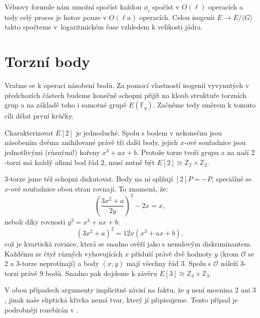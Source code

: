 \documentclass[12pt]{report}
\begin{document}
Véluovy formule nám umožní spočíst každou $\phi_i$ spočíst v $O(\ell)$ operacích a tedy celý proces je hotov pouze v $O(\ell a)$ operacích. Celou isogenii $E \longrightarrow E/\langle G \rangle$ takto spočteme v~logaritmickém čase vzhledem k velikosti jádra.

\section{Torzní body}

Vraťme se k operaci násobení bodů. Za pomocí vlastností isogenií vyvynutých v předchozích částech budeme konečně schopni přijít na kloub struktuře torzních grup a na základě toho i samotné grupě $E(\mathbb{F}_q)$. Začněme tedy směrem k tomuto cíli dělat první krůčky.

Charakterizovat $E[2]$ je jednoduché. Spolu s bodem v nekonečnu jsou násobením dvěma anihilované právě tři další body, jejich $x$-ové souřadnice jsou jednotlivými (různými!) kořeny $x^3+ax+b$. Protože torze tvoří grupu a na naší $2$-torzi má každý afinní bod řád $2$, musí nutně být $E[2] \cong \mathbb{Z}_2 \times \mathbb{Z}_2$.

$3$-torze jsme též schopni diskutovat. Body na ní splňují $[2]P = -P$, speciálně se $x$-ové souřadnice obou stran rovnají. To znamená, že:
\begin{equation*}
\left(\frac{3x^2+a}{2y}\right)^2 -2x = x,
\end{equation*}
neboli díky rovnosti $y^2 = x^3+ax+b$:
\begin{equation*}
(3x^2+a)^2 = 12x(x^3+ax+b),
\end{equation*}
což je kvartická rovnice, která se snadno ověří jako s nenulovým diskriminantem. Každému ze čtyř různých vyhovujících $x$ přísluší právě dvě hodnoty $y$ (krom $\mathcal{O}$ se $2$ a $3$-torze neprotínají) a body $(x,y)$ mají všechny řád $3$. Spolu s $\mathcal{O}$ náleží $3$-torzi právě $9$ bodů. Snadno pak dojdeme k závěru $E[3] \cong \mathbb{Z}_3 \times \mathbb{Z}_3$.

V obou případech argumenty implicitně závisí na faktu, že $q$ není mocnina $2$ ani $3$, jinak naše eliptická křivka nemá tvar, který jí připisujeme. Tento případ je podrobněji rozebírán v \cite[Ch. 3.1]{Washington}.
\end{document}

